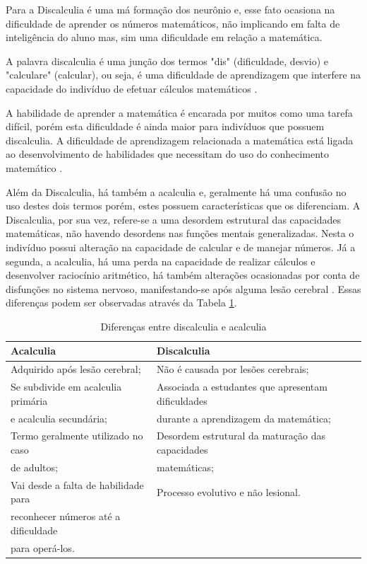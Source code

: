 \documentclass[
	12pt,				%
    oneside,			%
	a4paper,			%
	english,			%
	french,				%
	spanish,			%
	brazil,				%
	]{abntex2}
\begin{document}
Para  a Discalculia é uma má formação dos neurônio e, esse fato ocasiona na dificuldade de aprender os números matemáticos, não implicando em falta de inteligência do aluno mas, sim uma dificuldade em relação a matemática.

A palavra discalculia é uma junção dos termos "dis"  (dificuldade, desvio) e "calculare" (calcular), ou seja, é uma dificuldade de aprendizagem que interfere na capacidade do indivíduo de efetuar cálculos matemáticos \cite{Santos}.

A habilidade de aprender a matemática é encarada por muitos como uma tarefa difícil, porém esta dificuldade é ainda maior para indivíduos que possuem discalculia. A dificuldade de aprendizagem relacionada a matemática está ligada ao desenvolvimento de habilidades que necessitam do uso do conhecimento matemático \cite{Araman}.

Além da Discalculia, há também a acalculia e, geralmente há uma confusão no uso destes dois termos porém, estes possuem características que os diferenciam. A Discalculia, por sua vez, refere-se a uma desordem estrutural das capacidades matemáticas, não havendo desordens nas funções mentais generalizadas. Nesta o indivíduo possui alteração na capacidade de calcular e de manejar números. Já a segunda, a acalculia, há uma perda na capacidade de realizar cálculos e desenvolver raciocínio aritmético, há também alterações ocasionadas por conta de disfunções no sistema nervoso, manifestando-se após alguma lesão cerebral \cite{Santos}. Essas diferenças podem ser observadas através da Tabela \ref{diferencas}.

\begin{table}[h]
\caption{Diferenças entre discalculia e acalculia}
\begin{tabular}{|l|l|l}
\hline
 Acalculia & Discalculia \\ \hline
  Adquirido após lesão cerebral; & Não é causada por lesões cerebrais;  \\ \hline
  Se subdivide em acalculia primária & Associada a estudantes que apresentam dificuldades\\ 
  e acalculia secundária;  & durante a aprendizagem da matemática; \\ \hline
  Termo geralmente utilizado no caso & Desordem estrutural da maturação das capacidades \\
  de adultos; &  matemáticas; \\ \hline
  Vai desde a falta de habilidade para & Processo evolutivo e não lesional. \\
  reconhecer números até a dificuldade & \\ 
  para operá-los. & \\ \hline
\end{tabular}
\label{diferencas} 
\centering
{}
\end{table}
\end{document}
